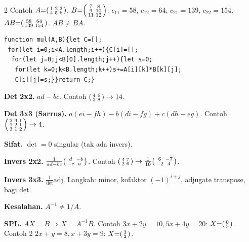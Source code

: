 \documentclass[8pt,a4paper]{extarticle}
\newcommand{\h}[1]{\textbf{#1}}
\begin{document}
\begin{multicols*}{2}
	Contoh $A{=}\begin{psmallmatrix}1&2&3\\4&5&6\end{psmallmatrix}$, $B{=}\begin{psmallmatrix}7&8\\9&10\\11&12\end{psmallmatrix}$: $c_{11}{=}58$, $c_{12}{=}64$, $c_{21}{=}139$, $c_{22}{=}154$. $AB{=}\begin{psmallmatrix}58&64\\139&154\end{psmallmatrix}$. $AB\neq BA$.

	\begin{lstlisting}
function mul(A,B){let C=[];
 for(let i=0;i<A.length;i++){C[i]=[];
  for(let j=0;j<B[0].length;j++){let s=0;
   for(let k=0;k<B.length;k++)s+=A[i][k]*B[k][j];
   C[i][j]=s;}}return C;}
\end{lstlisting}

	\h{Det 2x2.} $ad{-}bc$. Contoh $\begin{psmallmatrix}4&6\\3&8\end{psmallmatrix}\to14$.

	\h{Det 3x3 (Sarrus).} $a(ei{-}fh){-}b(di{-}fg){+}c(dh{-}eg)$. Contoh $\begin{psmallmatrix}2&3&1\\1&2&1\\3&1&2\end{psmallmatrix}\to4$.

	\h{Sifat.} $\det{=}0$ singular (tak ada invers).

	\h{Invers 2x2.} $\frac{1}{ad{-}bc}\begin{psmallmatrix}d&{-}b\\{-}c&a\end{psmallmatrix}$. Contoh $\begin{psmallmatrix}4&7\\2&6\end{psmallmatrix}\to\frac{1}{10}\begin{psmallmatrix}6&{-}7\\{-}2&4\end{psmallmatrix}$.

	\h{Invers 3x3.} $\frac{1}{\det}\text{adj}$. Langkah: minor, kofaktor $({-}1)^{i{+}j}$, adjugate transpose, bagi det.

	\h{Kesalahan.} $A^{-1}\neq1/A$.

	\h{SPL.} $AX{=}B\Rightarrow X{=}A^{-1}B$. Contoh $3x{+}2y{=}10,5x{+}4y{=}20$: $X{=}\begin{psmallmatrix}0\\5\end{psmallmatrix}$. Contoh 2 $2x{+}y{=}8,x{+}3y{=}9$: $X{=}\begin{psmallmatrix}3\\2\end{psmallmatrix}$.


\end{multicols*}
\end{document}
